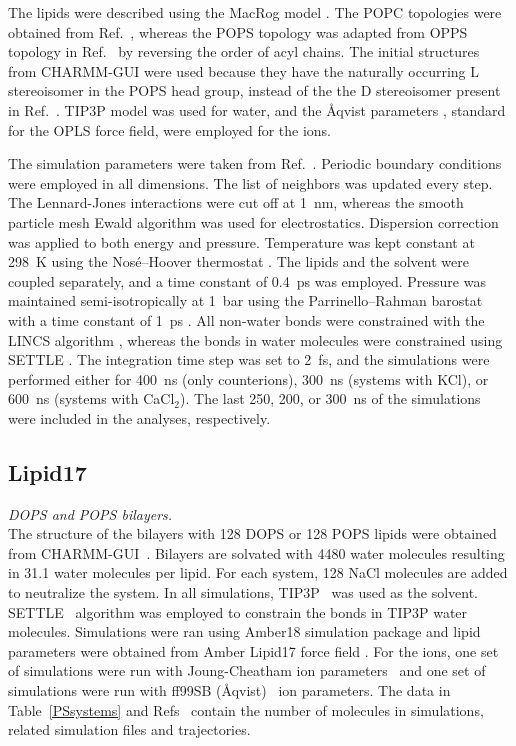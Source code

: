 \documentclass[journal=jpcbfk]{achemso}
\begin{document}
The lipids were described using the MacRog model \cite{maciejewski14,kulig15b,rog16}. The POPC topologies were obtained from 
Ref.~, whereas the POPS topology was adapted from OPPS topology in
Ref.~ by reversing the order of acyl chains.
The initial structures from CHARMM-GUI were used because they have the
naturally occurring L stereoisomer in the POPS head group, instead of the 
the D stereoisomer present in Ref.~.
TIP3P model \cite{jorgensen83} was used for water, and the \AA{}qvist parameters 
\cite{aqvist90}, standard for the OPLS force field, were employed for the ions. 

The simulation parameters were taken from Ref.~. 
Periodic boundary conditions were employed in all dimensions. The list of neighbors was updated every step. 
The Lennard-Jones interactions were cut off at 1~nm, whereas the smooth particle mesh Ewald algorithm 
\cite{essman95} was used for electrostatics. Dispersion correction \cite{shirts07} 
was applied to both energy and pressure. Temperature was kept constant at 298~K using the 
Nos\'{e}--Hoover thermostat \cite{nose84,hoover85}. The lipids and 
the solvent were coupled separately, and a time constant of 0.4~ps was employed. Pressure was 
maintained semi-isotropically at 1~bar using the Parrinello--Rahman barostat with a time constant of 1~ps 
\cite{parrinello81}. All non-water bonds were constrained with the LINCS algorithm 
\cite{hess97,hess07},
whereas the bonds in water molecules were constrained using SETTLE \cite{miyamoto92}.
The integration time step was set to 2~fs, and the simulations were performed either for 400~ns 
(only counterions), 300~ns (systems with KCl), or 600~ns (systems with CaCl$_2$). The last 
250, 200, or 300~ns of the simulations were included in the analyses, respectively.

\subsection{Lipid17}
{\it DOPS and POPS bilayers.} \\

The structure of the bilayers with 128 DOPS or 128 POPS lipids were
obtained from CHARMM-GUI~\cite{lee16,jo18}. Bilayers are solvated with
4480 water molecules resulting in 31.1 water molecules per lipid. For
each system, 128 NaCl molecules are added to neutralize the system.
In all simulations, TIP3P~\cite{jorgensen1983comparison} was used as the solvent. SETTLE~\cite{miyamoto92} algorithm was employed 
to constrain the bonds in TIP3P water molecules. Simulations were ran using Amber18 simulation package \cite{amber18md}
and lipid parameters were obtained from Amber Lipid17 force field \cite{gould18}. For the ions, one set of simulations were run with Joung-Cheatham
ion parameters~\cite{joung2008determination} and one set of simulations were run with ff99SB (\AA{}qvist)~\cite{aqvist90} ion parameters.
The data in Table~\ref{PSsystems} and Refs~ contain
the number of molecules in simulations, related simulation files and trajectories.
\end{document}
